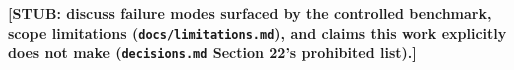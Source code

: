 \textbf{[STUB: discuss failure modes surfaced by the controlled benchmark,
scope limitations (\texttt{docs/limitations.md}), and claims this work
explicitly does not make (\texttt{decisions.md} Section 22's prohibited
list).]}

